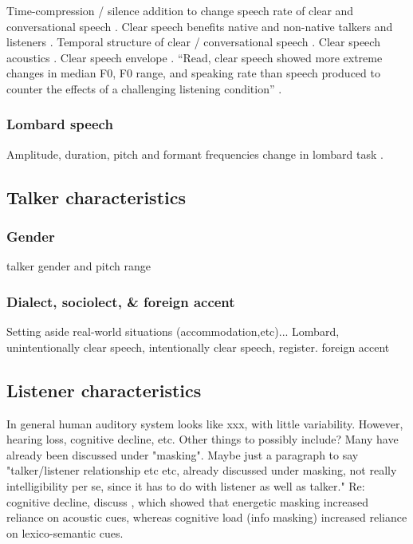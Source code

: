 Time-compression / silence addition to change speech rate of clear and conversational speech \citep{LiuZeng2006}.  
Clear speech benefits native and non-native talkers and listeners \citep{SmiljanicBradlow2011}.  
Temporal structure of clear / conversational speech \citep{SmiljanicBradlow2008}.  
Clear speech acoustics \citep{KrauseBraida2004}.  
Clear speech envelope \citep{KrauseBraida2009}.  
“Read, clear speech showed more extreme changes in median F0, F0 range, and speaking rate than speech produced to counter the effects of a challenging listening condition” \citep{HazanBaker2011}.

\subsubsection{Lombard speech}
Amplitude, duration, pitch and formant frequencies change in lombard task \citep{SummersEtAl1988}.

\subsection{Talker characteristics}

\subsubsection{Gender}
talker gender and pitch range \citep[e.g.,][]{BradlowEtAl1996}

\subsubsection{Dialect, sociolect, \& foreign accent}
Setting aside real-world situations (accommodation,etc)...  Lombard, unintentionally clear speech, intentionally clear speech, register.  foreign accent \citep{SmiljanicBradlow2011}

\subsection{Listener characteristics}
In general human auditory system looks like xxx, with little variability.  However, hearing loss, cognitive decline, etc.  Other things to possibly include?  Many have already been discussed under "masking".  Maybe just a paragraph to say "talker/listener relationship etc etc, already discussed under masking, not really intelligibility per se, since it has to do with listener as well as talker."  Re: cognitive decline, discuss \citep{MattysEtAl2009}, which showed that energetic masking increased reliance on acoustic cues, whereas cognitive load (info masking) increased reliance on lexico-semantic cues. 

